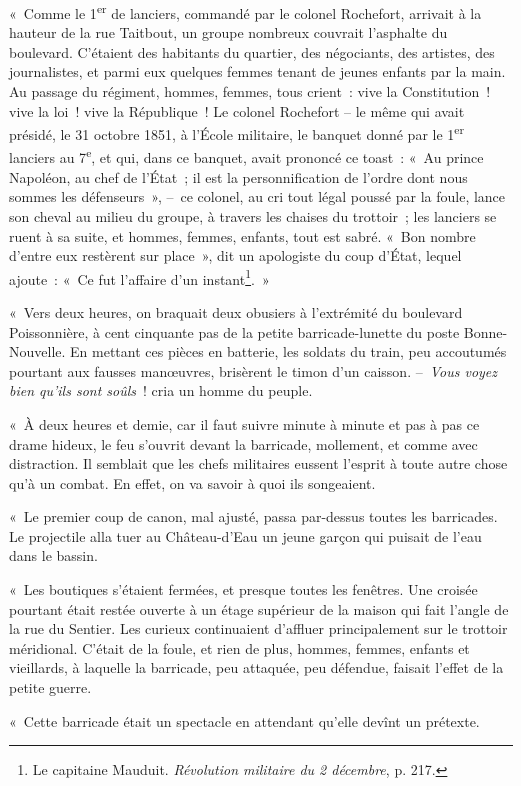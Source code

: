 \documentclass[french,twoside]{book} %
\begin{document}
« Comme le 1\textsuperscript{er} de lanciers, commandé par le colonel Rochefort, arrivait à la hauteur de la rue Taitbout, un groupe nombreux couvrait l’asphalte du boulevard. C’étaient des habitants du quartier, des négociants, des artistes, des journalistes, et parmi eux quelques femmes tenant de jeunes enfants par la main. Au passage du régiment, hommes, femmes, tous crient : vive la Constitution ! vive la loi ! vive la République ! Le colonel Rochefort – le même qui avait présidé, le 31 octobre 1851, à l’École militaire, le banquet donné par le 1\textsuperscript{er} lanciers au 7\textsuperscript{e}, et qui, dans ce banquet, avait prononcé ce toast : « Au prince Napoléon, au chef de l’État ; il est la personnification de l’ordre dont nous sommes les défenseurs », – ce colonel, au cri tout légal poussé par la foule, lance son cheval au milieu du groupe, à travers les chaises du trottoir ; les lanciers se ruent à sa suite, et hommes, femmes, enfants, tout est sabré. « Bon nombre d’entre eux restèrent sur place », dit un apologiste du coup d’État, lequel ajoute : « Ce fut l’affaire d’un instant\footnote{Le capitaine Mauduit. \emph{Révolution militaire du 2 décembre}, p. 217.}. »\par
« Vers deux heures, on braquait deux obusiers à l’extrémité du boulevard Poissonnière, à cent cinquante pas de la petite barricade-lunette du poste Bonne-Nouvelle. En mettant ces pièces en batterie, les soldats du train, peu accoutumés pourtant aux fausses manœuvres, brisèrent le timon d’un caisson. – \emph{Vous voyez bien qu’ils sont soûls} ! cria un homme du peuple.\par
« À deux heures et demie, car il faut suivre minute à minute et pas à pas ce drame hideux, le feu s’ouvrit devant la barricade, mollement, et comme avec distraction. Il semblait que les chefs militaires eussent l’esprit à toute autre chose qu’à un combat. En effet, on va savoir à quoi ils songeaient.\par
« Le premier coup de canon, mal ajusté, passa par-dessus toutes les barricades. Le projectile alla tuer au Château-d’Eau un jeune garçon qui puisait de l’eau dans le bassin.\par
« Les boutiques s’étaient fermées, et presque toutes les fenêtres. Une croisée pourtant était restée ouverte à un étage supérieur de la maison qui fait l’angle de la rue du Sentier. Les curieux continuaient d’affluer principalement sur le trottoir méridional. C’était de la foule, et rien de plus, hommes, femmes, enfants et vieillards, à laquelle la barricade, peu attaquée, peu défendue, faisait l’effet de la petite guerre.\par
« Cette barricade était un spectacle en attendant qu’elle devînt un prétexte.
\end{document}

